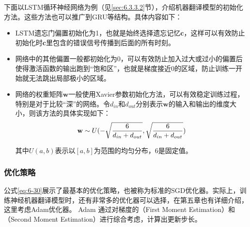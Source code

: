\parinterval 下面以LSTM循环神经网络为例（见\ref{sec:6.3.3.2}节），介绍机器翻译模型的初始化方法。这些方法也可以推广到GRU等结构。具体内容如下：

\begin{itemize}
\vspace{0.5em}
\item LSTM遗忘门偏置初始化为1，也就是始终选择遗忘记忆$\mathbf{c}$，这样可以有效防止初始化时$\mathbf{c}$里包含的错误信号传播到后面的所有时刻。
\vspace{0.5em}
\item 网络中的其他偏置一般都初始化为0，可以有效防止加入过大或过小的偏置后使得激活函数的输出跑到``饱和区''，也就是梯度接近0的区域，防止训练一开始就无法跳出局部极小的区域。
\vspace{0.5em}
\item 网络的权重矩阵$\mathbf{w}$一般使用Xavier参数初始化方法\cite{pmlr-v9-glorot10a}，可以有效稳定训练过程，特别是对于比较``深''的网络。令$d_{in}$和$d_{out}$分别表示$\mathbf{w}$的输入和输出的维度大小，则该方法的具体实现如下：
\begin{eqnarray}
\mathbf{w} \sim U(-\sqrt{ \frac{6} { d_{in} + d_{out} } } , \sqrt{ \frac{6} { d_{in} + d_{out} } })
\label{eq:6-32}
\vspace{0.5em}
\end{eqnarray}

其中$U(a,b)$表示以$[a,b]$为范围的均匀分布，$6$是固定值。\\
\end{itemize}

\vspace{-0.5em}
\subsubsection{优化策略}

\vspace{0.5em}
\parinterval 公式\ref{eq:6-30}展示了最基本的优化策略，也被称为标准的SGD优化器。实际上，训练神经机器翻译模型时，还有非常多的优化器可以选择，在第五章也有详细介绍，这里考虑Adam优化器。 Adam 通过对梯度的{\small{}}（First Moment Estimation）和{\small{}}（Second Moment Estimation）进行综合考虑，计算出更新步长。

